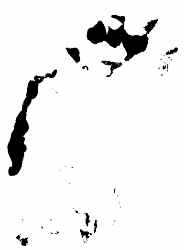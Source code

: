 \documentclass[12pt,a4paper]{article}
\begin{document}
\begin{figure}
\begin{subfigure}[b]{0.19\textwidth}
        \includegraphics[width=\textwidth]{../img/2014w.jpg}
    \end{subfigure}
    \begin{subfigure}[b]{0.19\textwidth}
        \centering

\end{subfigure}
\end{figure}
\end{document}
